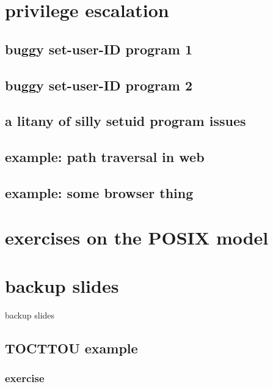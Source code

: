 \section{privilege escalation}


\subsection{buggy set-user-ID program 1}


\subsection{buggy set-user-ID program 2}


\subsection{a litany of silly setuid program issues}


\subsection{example: path traversal in web}

\subsection{example: some browser thing}


\section{exercises on the POSIX model}


\section{backup slides}
\begin{frame}{backup slides}
\end{frame}

\subsection{TOCTTOU example}




\subsubsection{exercise}


